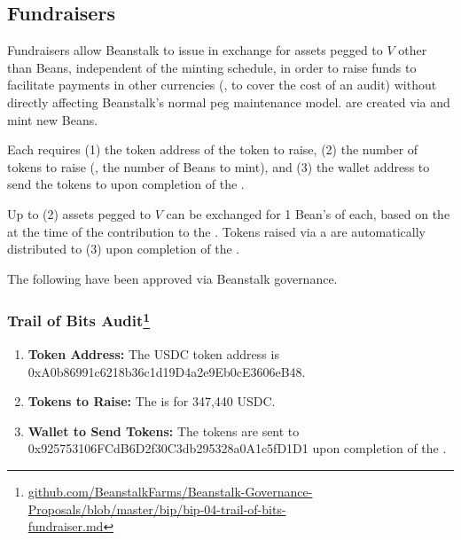 \documentclass[class=article, crop=false]{standalone}
\begin{document}
\subsection{Fundraisers}
Fundraisers allow Beanstalk to issue  in exchange for assets pegged to $V$ other than Beans, independent of the  minting schedule, in order to raise funds to facilitate payments in other currencies (, to cover the cost of an audit) without directly affecting Beanstalk's normal peg maintenance model.  are created via  and mint new Beans. 

Each  requires (1) the token address of the token to raise, (2) the number of tokens to raise (, the number of Beans to mint), and (3) the wallet address to send the tokens to upon completion of the . 

Up to (2) assets pegged to $V$ can be exchanged for 1  Bean's  of  each, based on the  at the time of the contribution to the . Tokens raised via a  are automatically distributed to (3) upon completion of the .

The following  have been approved via Beanstalk governance.

\subsubsection[Trail of Bits Audit]{Trail of Bits Audit\protect \footnote{\href{https://github.com/BeanstalkFarms/Beanstalk-Governance-Proposals/blob/master/bip/bip-04-trail-of-bits-fundraiser.md}{github.com/BeanstalkFarms/Beanstalk-Governance-Proposals/blob/master/bip/bip-04-trail-of-bits-\\fundraiser.md}}}
    \begin{enumerate}
        \item \textbf{Token Address:} The USDC token address is 0xA0b86991c6218b36c1d19D4a2e9Eb0cE3606eB48.
        \item \textbf{Tokens to Raise:} The  is for 347,440 USDC.
        \item \textbf{Wallet to Send Tokens:} The tokens are sent to 0x925753106FCdB6D2f30C3db295328a0A1c5fD1D1 upon completion of the .
    \end{enumerate}
\end{document}
